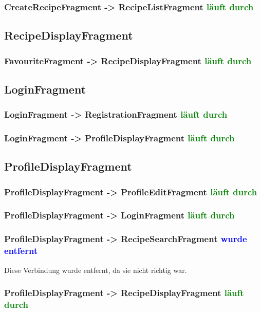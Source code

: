 \subsubsection{CreateRecipeFragment -> RecipeListFragment \textcolor{green}{läuft durch}}

\subsection{RecipeDisplayFragment}
\subsubsection{FavouriteFragment -> RecipeDisplayFragment \textcolor{green}{läuft durch}}

\subsection{LoginFragment}
\subsubsection{LoginFragment -> RegistrationFragment \textcolor{green}{läuft durch}}
\subsubsection{LoginFragment -> ProfileDisplayFragment \textcolor{green}{läuft durch}}

\subsection{ProfileDisplayFragment}
\subsubsection{ProfileDisplayFragment -> ProfileEditFragment \textcolor{green}{läuft durch}}
\subsubsection{ProfileDisplayFragment -> LoginFragment \textcolor{green}{läuft durch}}
\subsubsection{ProfileDisplayFragment -> RecipeSearchFragment \textcolor{blue}{wurde entfernt}}
Diese Verbindung wurde entfernt, da sie nicht richtig war. 
\subsubsection{ProfileDisplayFragment -> RecipeDisplayFragment \textcolor{green}{läuft durch}} 

